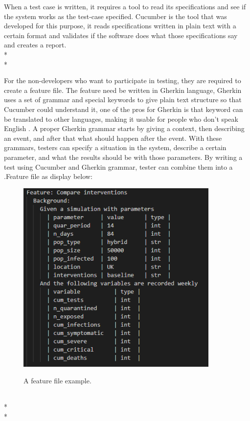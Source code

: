 When a test case is written, it requires a tool to read its specifications and see if the system works as the test-case specified. Cucumber is the tool that was developed for this purpose, it reads specifications written in plain text with a certain format and validates if the software does what those specifications say \cite{Reference14} and creates a report. \\*\\*

For the non-developers who want to participate in testing, they are required to create a feature file. The feature need be written in Gherkin language, Gherkin uses a set of grammar and special keywords to give plain text structure so that Cucumber could understand it, one of the pros for Gherkin is that keyword can be translated to other languages, making it usable for people who don’t speak English \cite{Reference15}. A proper Gherkin grammar starts by giving a context, then describing an event, and after that what should happen after the event. With these grammars, testers can specify a situation in the system, describe a certain parameter, and what the results should be with those parameters. By writing a test using Cucumber and Gherkin grammar, tester can combine them into a .Feature file as display below: 
\begin{figure}[h]
	\centering
	\includegraphics[width=10cm]{figures/featureFile.png}\\
	\caption{A feature file example.}
	\label{fig:figure1}
\end{figure}
\newpage \noindent 
\\*\\*

